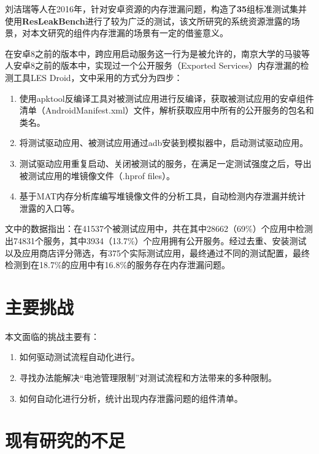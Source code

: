 刘洁瑞等人在2016年，针对安卓资源的内存泄漏问题，构造了\textbf{35}组标准测试集并使用\textbf{ResLeakBench}\cite{liu2016}进行了较为广泛的测试，该文所研究的系统资源泄露的场景，对本文研究的组件内存泄漏的场景有一定的借鉴意义。
\newline

在安卓8之前的版本中，跨应用启动服务这一行为是被允许的，南京大学的马骏等人安卓8之前的版本中，实现过一个公开服务（Exported Services）内存泄漏的检测工具LES Droid\cite{jun2018lesdroid}，文中采用的方式分为四步：

\begin{enumerate}
	\item 使用apktool反编译工具\cite{apktool}对被测试应用进行反编译，获取被测试应用的安卓组件清单（AndroidManifest.xml）文件，解析获取应用中所有的公开服务的包名和类名。
	\item 将测试驱动应用、被测试应用通过adb安装到模拟器中，启动测试驱动应用。
	\item 测试驱动应用重复启动、关闭被测试的服务，在满足一定测试强度之后，导出被测试应用的堆镜像文件（.hprof files）。
	\item 基于MAT内存分析库\cite{mat}编写堆镜像文件的分析工具，自动检测内存泄漏并统计泄露的入口等。
\end{enumerate}

\label{pre-result}
文中的数据指出：在41537个被测试应用中，共在其中28662（69\%）个应用中检测出74831个服务，其中3934（13.7\%）个应用拥有公开服务。经过去重、安装测试以及应用商店评分筛选，有375个实际测试应用，最终通过不同的测试配置，最终检测到在18.7\%的应用中有16.8\%的服务存在内存泄漏问题。

\section{主要挑战}

本文面临的挑战主要有：

\begin{enumerate}
	\item 如何驱动测试流程自动化进行。
	\item 寻找办法能解决“电池管理限制”对测试流程和方法带来的多种限制。
	\item 如何自动化进行分析，统计出现内存泄露问题的组件清单。
\end{enumerate}

\section{现有研究的不足}

